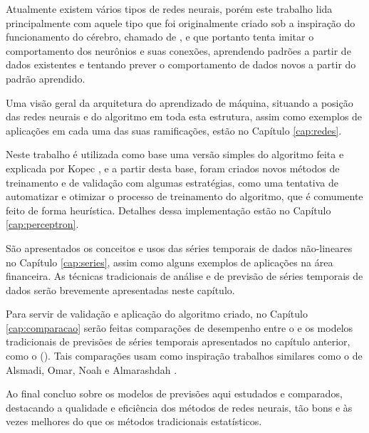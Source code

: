 Atualmente existem vários tipos de redes neurais, porém este trabalho lida principalmente com aquele tipo que foi originalmente criado sob a inspiração do funcionamento do cérebro, chamado de , e que portanto tenta imitar o comportamento dos neurônios e suas conexões, aprendendo padrões a partir de dados existentes e tentando prever o comportamento de dados novos a partir do padrão aprendido.

Uma visão geral da arquitetura do aprendizado de máquina, situando a posição das redes neurais e do algoritmo  em toda esta estrutura, assim como exemplos de aplicações em cada uma das suas ramificações, estão no Capítulo \ref{cap:redes}.

Neste trabalho é utilizada como base uma versão simples do algoritmo  feita e explicada por Kopec \citep{classic}, e a partir desta base, foram criados novos métodos de treinamento e de validação com algumas estratégias, como uma tentativa de automatizar e otimizar o processo de treinamento do algoritmo, que é comumente feito de forma heurística. Detalhes dessa implementação estão no Capítulo \ref{cap:perceptron}.

São apresentados os conceitos e usos das séries temporais de dados não-lineares no Capítulo \ref{cap:series}, assim como alguns exemplos de aplicações na área financeira. As técnicas tradicionais de análise e de previsão de séries temporais de dados serão brevemente apresentadas neste capítulo.

Para servir de validação e aplicação do algoritmo criado, no Capítulo \ref{cap:comparacao} serão feitas comparações de desempenho entre o  e os modelos tradicionais de previsões de séries temporais apresentados no capítulo anterior, como o  (). Tais comparações usam como inspiração trabalhos similares como o de Alsmadi, Omar, Noah e Almarashdah \citep{4809024}.

Ao final concluo sobre os modelos de previsões aqui estudados e comparados, destacando a qualidade e eficiência dos métodos de redes neurais, tão bons e às vezes melhores do que os métodos tradicionais estatísticos.

